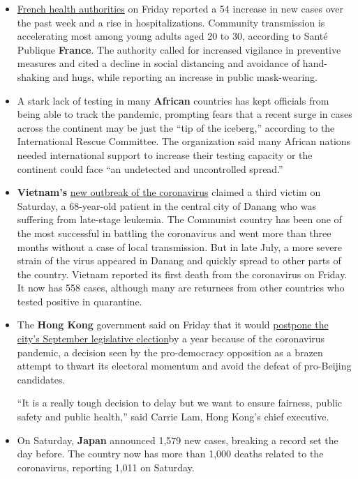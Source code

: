 \begin{itemize}
\item
  \href{https://www.santepubliquefrance.fr/maladies-et-traumatismes/maladies-et-infections-respiratoires/infection-a-coronavirus/documents/bulletin-national/covid-19-point-epidemiologique-du-30-juillet-2020}{French
  health authorities} on Friday reported a 54 increase in new cases over
  the past week and a rise in hospitalizations. Community transmission
  is accelerating most among young adults aged 20 to 30, according to
  Santé Publique \textbf{France}. The authority called for increased
  vigilance in preventive measures and cited a decline in social
  distancing and avoidance of hand-shaking and hugs, while reporting an
  increase in public mask-wearing.
\item
  A stark lack of testing in many \textbf{African} countries has kept
  officials from being able to track the pandemic, prompting fears that
  a recent surge in cases across the continent may be just the ``tip of
  the iceberg,'' according to the International Rescue Committee. The
  organization said many African nations needed international support to
  increase their testing capacity or the continent could face ``an
  undetected and uncontrolled spread.''
\item
  \textbf{Vietnam's}
  \href{https://www.nytimes.com/2020/07/29/world/asia/coronavirus-vietnam.html}{new
  outbreak of the coronavirus} claimed a third victim on Saturday, a
  68-year-old patient in the central city of Danang who was suffering
  from late-stage leukemia. The Communist country has been one of the
  most successful in battling the coronavirus and went more than three
  months without a case of local transmission. But in late July, a more
  severe strain of the virus appeared in Danang and quickly spread to
  other parts of the country. Vietnam reported its first death from the
  coronavirus on Friday. It now has 558 cases, although many are
  returnees from other countries who tested positive in quarantine.
\item
  The \textbf{Hong Kong} government said on Friday that it would
  \href{https://www.nytimes.com/2020/07/31/world/asia/hong-kong-election-delayed.html}{postpone
  the city's September legislative election}by a year because of the
  coronavirus pandemic, a decision seen by the pro-democracy opposition
  as a brazen attempt to thwart its electoral momentum and avoid the
  defeat of pro-Beijing candidates.

  ``It is a really tough decision to delay but we want to ensure
  fairness, public safety and public health,'' said Carrie Lam, Hong
  Kong's chief executive.
\item
  On Saturday, \textbf{Japan} announced 1,579 new cases, breaking a
  record set the day before. The country now has more than 1,000 deaths
  related to the coronavirus, reporting 1,011 on Saturday.
\end{itemize}

